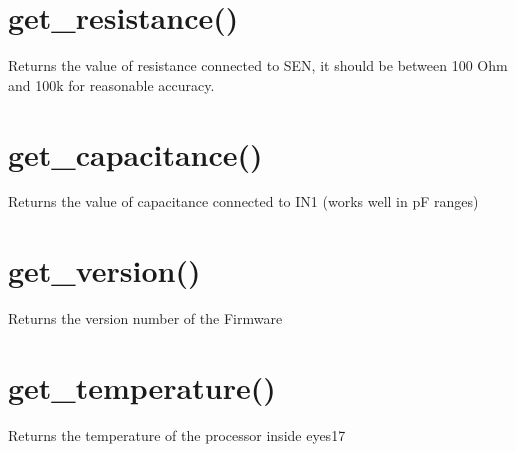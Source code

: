 \documentclass[a4paper,12pt,english]{sphinxmanual}
\begin{document}
\section{get\_resistance()}
\label{\detokenize{7.1:get-resistance}}
Returns the value of resistance connected to SEN, it should be between
100 Ohm and 100k for reasonable accuracy.

\begin{sphinxVerbatim}[commandchars=\\\{\}]
 
\end{sphinxVerbatim}


\section{get\_capacitance()}
\label{\detokenize{7.1:get-capacitance}}
Returns the value of capacitance connected to IN1 (works well in pF
ranges)

\begin{sphinxVerbatim}[commandchars=\\\{\}]
 
\end{sphinxVerbatim}


\section{get\_version()}
\label{\detokenize{7.1:get-version}}
Returns the version number of the Firmware

\begin{sphinxVerbatim}[commandchars=\\\{\}]
 
\end{sphinxVerbatim}


\section{get\_temperature()}
\label{\detokenize{7.1:get-temperature}}
Returns the temperature of the processor inside eyes17

\begin{sphinxVerbatim}[commandchars=\\\{\}]
 
\end{sphinxVerbatim}
\end{document}
